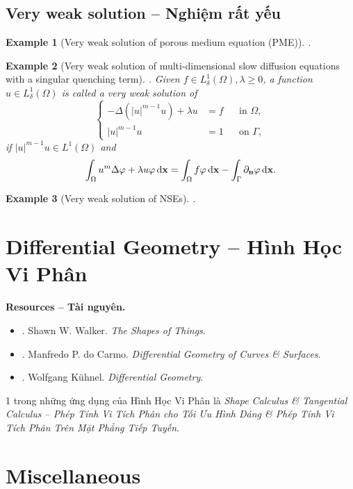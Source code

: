 \documentclass{article}
\newtheorem{example}{Example}
\begin{document}

\subsection{Very weak solution -- Nghiệm rất yếu}

\begin{example}[Very weak solution of porous medium equation (PME)]
	\cite{Vazquez2007}.
\end{example}

\begin{example}[Very weak solution of multi-dimensional slow diffusion equations with a singular quenching term]
	\cite{Dao_Diaz_Nguyen2020}. Given $f\in L_\delta^1(\Omega),\lambda\ge0$, a function $u\in L_\delta^1(\Omega)$ is called a \emph{very weak solution} of
	\begin{equation}
		\left\{\begin{split}
			-\Delta(|u|^{m-1}u) + \lambda u &= f&&\mbox{in }\Omega,\\
			|u|^{m-1}u &= 1&&\mbox{on }\Gamma,
		\end{split}\right.
	\end{equation}
	if $|u|^{m-1}u\in L^1(\Omega)$ and
	\begin{equation}
		\int_\Omega u^m\Delta\varphi + \lambda u\varphi\,{\rm d}{\bf x} = \int_\Omega f\varphi\,{\rm d}{\bf x} - \int_\Gamma \partial_{\bf n}\varphi\,{\rm d}{\bf x}.
	\end{equation}
\end{example}

\begin{example}[Very weak solution of NSEs]
	\cite{Tsai2018}.
\end{example}


\section{Differential Geometry -- Hình Học Vi Phân}
\noindent\textbf{\textsf{Resources -- Tài nguyên.}}
\begin{itemize}
	\item \cite{Walker2015}. {\sc Shawn W. Walker}. {\it The Shapes of Things}.
	\item \cite{Carmo2016}. {\sc Manfredo P. do Carmo}. {\it Differential Geometry of Curves \& Surfaces}.
	\item \cite{Kuhnel2015}. {\sc Wolfgang K\"uhnel}. {\it Differential Geometry}.
\end{itemize}
1 trong những ứng dụng của Hình Học Vi Phân là {\it Shape Calculus \& Tangential Calculus -- Phép Tính Vi Tích Phân cho Tối Ưu Hình Dáng \& Phép Tính Vi Tích Phân Trên Mặt Phẳng Tiếp Tuyến}.


\section{Miscellaneous}


\printbibliography[heading=bibintoc]
	
\end{document}
